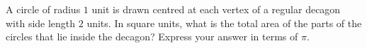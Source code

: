 A circle of radius $1$ unit is drawn centred at each vertex of a regular decagon with side length $2$ units. In square units, what is the total area of the parts of the circles that lie inside the decagon? Express your answer in terms of $\pi$.
